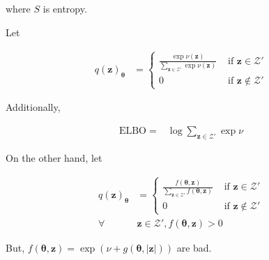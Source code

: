 \documentclass[notitlepage]{article}
\begin{document}
where $S$ is entropy. 

Let

\begin{align}
    q(\bm{z})_{\bm{\theta}} &= \begin{cases}
        \frac{\exp\nu(\bm{z})}{\sum_{\bm{z}\in\mathcal{Z}'}\exp\nu(\bm{z})} & \text{ if } \bm{z} \in \mathcal{Z}' \\ 
        0 & \text{ if } \bm{z} \notin \mathcal{Z}'
    \end{cases}
\end{align}

Additionally, 

\begin{align}
    \mathrm{ELBO} =& \log\sum_{\bm{z}\in\mathcal{Z}'}\exp\nu
\end{align}

On the other hand, let

\begin{align}
    q(\bm{z})_{\bm{\theta}} &= \begin{cases}
        \frac{f(\bm{\theta},\bm{z})}{\sum_{\bm{z}\in\mathcal{Z}'}f(\bm{\theta},\bm{z})} & \text{ if } \bm{z} \in \mathcal{Z}' \\ 
        0 & \text{ if } \bm{z} \notin \mathcal{Z}'
    \end{cases} \\
    \forall &\bm{z}\in\mathcal{Z}', f(\bm{\theta},\bm{z}) > 0
\end{align}

But, $f(\bm{\theta},\bm{z})=\exp{(\nu+g(\bm{\theta},|\bm{z}|))}$ are bad. 
\end{document}
